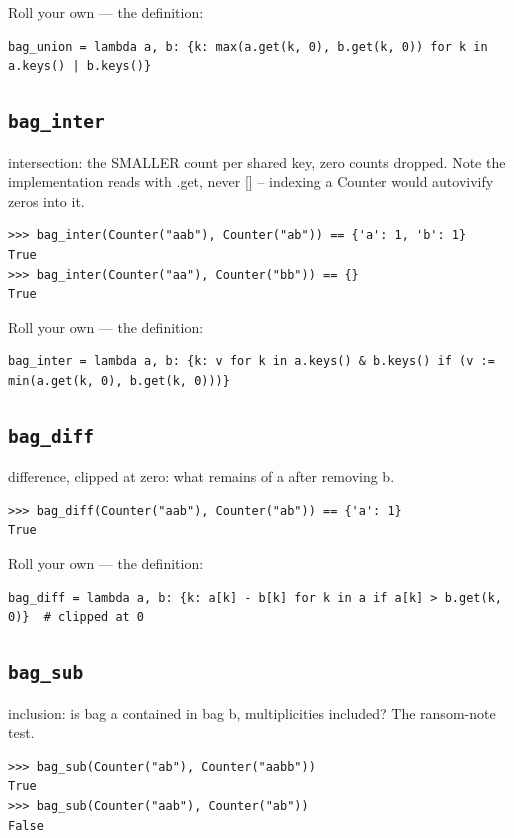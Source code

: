 \documentclass[10pt,letterpaper]{book}
\begin{document}
Roll your own --- the definition:

\begin{lstlisting}[style=ex]
bag_union = lambda a, b: {k: max(a.get(k, 0), b.get(k, 0)) for k in a.keys() | b.keys()}
\end{lstlisting}
\subsection{\texttt{bag\_inter}}\label{def:bag-inter}
intersection: the SMALLER count per shared key, zero counts dropped. Note the implementation reads with .get, never [] -- indexing a Counter would autovivify zeros into it.
\begin{lstlisting}[style=ex]
>>> bag_inter(Counter("aab"), Counter("ab")) == {'a': 1, 'b': 1}
True
>>> bag_inter(Counter("aa"), Counter("bb")) == {}
True
\end{lstlisting}

Roll your own --- the definition:

\begin{lstlisting}[style=ex]
bag_inter = lambda a, b: {k: v for k in a.keys() & b.keys() if (v := min(a.get(k, 0), b.get(k, 0)))}
\end{lstlisting}
\subsection{\texttt{bag\_diff}}\label{def:bag-diff}
difference, clipped at zero: what remains of a after removing b.
\begin{lstlisting}[style=ex]
>>> bag_diff(Counter("aab"), Counter("ab")) == {'a': 1}
True
\end{lstlisting}

Roll your own --- the definition:

\begin{lstlisting}[style=ex]
bag_diff = lambda a, b: {k: a[k] - b[k] for k in a if a[k] > b.get(k, 0)}  # clipped at 0
\end{lstlisting}
\subsection{\texttt{bag\_sub}}\label{def:bag-sub}
inclusion: is bag a contained in bag b, multiplicities included? The ransom-note test.
\begin{lstlisting}[style=ex]
>>> bag_sub(Counter("ab"), Counter("aabb"))
True
>>> bag_sub(Counter("aab"), Counter("ab"))
False
\end{lstlisting}
\end{document}
